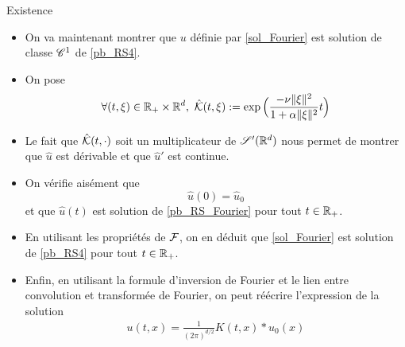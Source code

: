 \begin{frame}{Existence}
\begin{itemize}
\item On va maintenant montrer que $u$ définie 
par \eqref{sol_Fourier} est solution de classe $\mathscr{C}^1$ de 
\eqref{pb_RS4}. 
\item On pose 
\begin{equation*}
    \forall (t,\xi) \in \mathbb{R}_+ \times \mathbb{R}^d, \ \hat{\mathcal{K}}(t,\xi) := \exp\Big(\dfrac{-\nu \|\xi\|^2}{1+\alpha\|\xi\|^2}t\Big)
\end{equation*} 
\item Le fait que $\hat{\mathcal{K}}(t,\cdot)$ soit un multiplicateur de 
$\mathscr{S}'(\mathbb{R}^d)$ nous permet de montrer que $\hat{u}$ est 
dérivable et que $\hat{u}'$ est continue.
    \item On vérifie aisément que 
\begin{equation*}
    \hat{u}(0)=\hat{u}_0
\end{equation*}
et que $\hat{u}(t)$ est solution de \eqref{pb_RS_Fourier} pour 
tout $t \in \mathbb{R}_+$. 
\item En utilisant les propriétés de $\mathcal{F}$, on en déduit que \eqref{sol_Fourier} est 
solution de \eqref{pb_RS4} pour tout $t \in \mathbb{R}_+$. 
\item Enfin, en 
utilisant la formule d'inversion de Fourier et le lien entre 
convolution et transformée de Fourier, on peut réécrire l'expression de la 
solution
\begin{eqnarray}\label{sol_S'}
     u(t,x) = \frac{1}{(2\pi)^{d/2}}K(t,x)*u_0(x)
\end{eqnarray}
\end{itemize}
\end{frame}


